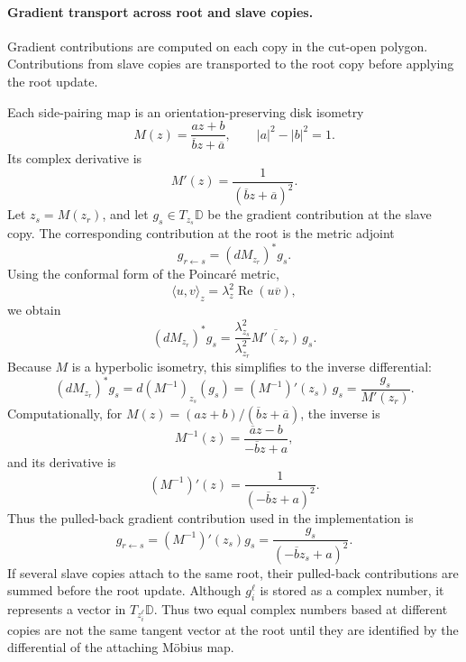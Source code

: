 \documentclass[12pt]{article}
\newcommand{\D}{\mathbb D}
\theoremstyle{definition}
\theoremstyle{remark}
\numberwithin{equation}{section}
\begin{document}
\paragraph{Gradient transport across root and slave copies.}
Gradient contributions are computed on each copy in the cut-open polygon. Contributions from slave copies are transported to the root copy before applying the root update.

Each side-pairing map is an orientation-preserving disk isometry
\[
M(z)=\frac{az+b}{\overline{b}z+\overline{a}}, \qquad |a|^2-|b|^2=1.
\]
Its complex derivative is
\[
M'(z)=\frac{1}{(\overline{b}z+\overline{a})^2}.
\]
Let $z_s=M(z_r)$, and let $g_s\in T_{z_s}\D$ be the gradient contribution at the slave copy. The corresponding contribution at the root is the metric adjoint
\[
g_{r\leftarrow s} = (dM_{z_r})^{*}g_s.
\]
Using the conformal form of the Poincaré metric,
\[
\langle u,v\rangle_z=\lambda_z^2\operatorname{Re}(u\overline{v}),
\]
we obtain
\[
(dM_{z_r})^{*}g_s = \frac{\lambda_{z_s}^2}{\lambda_{z_r}^2} \overline{M'(z_r)}\,g_s.
\]
Because $M$ is a hyperbolic isometry, this simplifies to the inverse differential:
\[
(dM_{z_r})^{*}g_s = d(M^{-1})_{z_s}(g_s) = (M^{-1})'(z_s)\,g_s = \frac{g_s}{M'(z_r)}.
\]
Computationally, for $M(z)=(az+b)/(\overline{b}z+\overline{a})$, the inverse is
\[
M^{-1}(z)=\frac{\overline{a}z-b}{-\overline{b}z+a},
\]
and its derivative is
\[
(M^{-1})'(z)=\frac{1}{(-\overline{b}z+a)^2}.
\]
Thus the pulled-back gradient contribution used in the implementation is
\begin{equation}
\label{eq:pullback-gradient}
g_{r\leftarrow s} = (M^{-1})'(z_s)g_s = \frac{g_s}{(-\overline{b}z_s+a)^2}.
\end{equation}
If several slave copies attach to the same root, their pulled-back contributions are summed before the root update. Although $g_i^\ell$ is stored as a complex number, it represents a vector in $T_{z_i^\ell}\D$. Thus two equal complex numbers based at different copies are not the same tangent vector at the root until they are identified by the differential of the attaching Möbius map.
\end{document}

